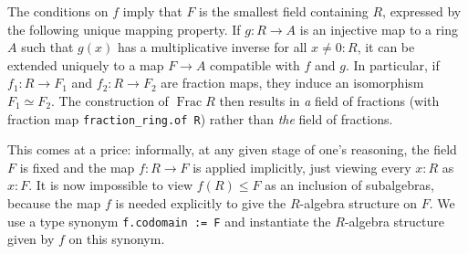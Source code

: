 \documentclass[a4paper,USenglish,cleveref, autoref, thm-restate]{lipics-v2021}
\newcommand{\lean}[1]{\texttt{#1}\xspace} %
\newcommand{\Q}{\mathbb{Q}}
\newcommand{\Z}{\mathbb{Z}}
\DeclareMathOperator{\Frac}{Frac}
\begin{document}
The conditions on $f$ imply that $F$ is the smallest field containing $R$, expressed by the following unique mapping property.
If $g \colon R \to A$ is an injective map to a ring $A$ such that $g(x)$ has a multiplicative inverse for all $x \ne 0 : R$,
it can be extended uniquely to a map $F \to A$ compatible with $f$ and $g$.
In particular, if $f_1 \colon R \to F_1$ and $f_2 \colon R \to F_2$ are fraction maps, they induce an isomorphism $F_1 \simeq F_2$.
The construction of $\Frac R$ then results in \emph{a} field of fractions (with fraction map \lean{fraction\_ring.of R}) rather than \emph{the} field of fractions.


This comes at a price: %
informally, at any given stage of one's reasoning, the field $F$ is fixed and the map $f\colon R\to F$ is applied implicitly, just viewing every $x:R$ as $x:F$.
It is now impossible to view $f(R) \leq F$ as an inclusion of subalgebras,
because the map $f$ is needed explicitly to give the $R$-algebra structure on $F$.
We use a type synonym \lean{f.codomain := F} and instantiate the $R$-algebra structure given by $f$ on this synonym.

\end{document}

